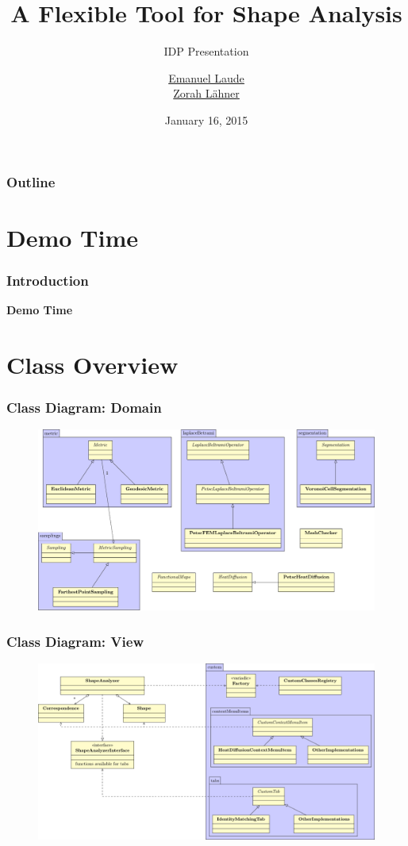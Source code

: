 \documentclass[compress]{beamer}
\title{A Flexible Tool for Shape Analysis}
\subtitle{IDP Presentation}
\author{\href{emanuel.laude@in.tum.de}{Emanuel Laude}\\ \href{laehner@in.tum.de}{Zorah L\"ahner} }
\date{January 16, 2015}
\institute{Technische Universit\"at M\"unchen}
\begin{document}
\begin{frame}
  \titlepage
\end{frame}

\begin{frame}
  \frametitle{Outline}
  \tableofcontents
\end{frame}

\section{Demo Time}

\begin{frame}
	\frametitle{Introduction}
	
	\bf{Demo Time}
	
\end{frame}

\section{Class Overview}

\begin{frame}
  \frametitle{Class Diagram: Domain}
  \begin{figure}[h]
	\centering
	\includegraphics[width=\textwidth]{diagram2.pdf}
\end{figure}
\end{frame}

\begin{frame}
  \frametitle{Class Diagram: View}
  \begin{figure}[h]
	\centering
	\includegraphics[width=\textwidth]{diagram.pdf}
\end{figure}
\end{frame}
\end{document}
